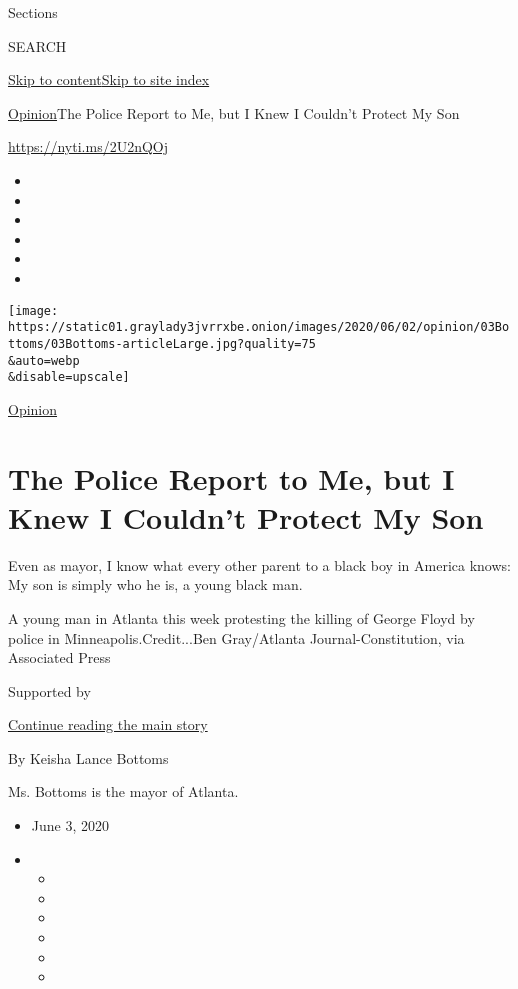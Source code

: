 Sections

SEARCH

\protect\hyperlink{site-content}{Skip to
content}\protect\hyperlink{site-index}{Skip to site index}

\href{/section/opinion}{Opinion}\textbar{}The Police Report to Me, but I
Knew I Couldn't Protect My Son

\href{https://nyti.ms/2U2nQOj}{https://nyti.ms/2U2nQOj}

\begin{itemize}
\item
\item
\item
\item
\item
\item
\end{itemize}

\texttt{[image: https://static01.graylady3jvrrxbe.onion/images/2020/06/02/opinion/03Bottoms/03Bottoms-articleLarge.jpg?quality=75\\\&auto=webp\\\&disable=upscale]}

\href{/section/opinion}{Opinion}

\hypertarget{the-police-report-to-me-but-i-knew-i-couldnt-protect-my-son}{%
\section{The Police Report to Me, but I Knew I Couldn't Protect My
Son}\label{the-police-report-to-me-but-i-knew-i-couldnt-protect-my-son}}

Even as mayor, I know what every other parent to a black boy in America
knows: My son is simply who he is, a young black man.

A young man in Atlanta this week protesting the killing of George Floyd
by police in Minneapolis.Credit...Ben Gray/Atlanta Journal-Constitution,
via Associated Press

Supported by

\protect\hyperlink{after-sponsor}{Continue reading the main story}

By Keisha Lance Bottoms

Ms. Bottoms is the mayor of Atlanta.

\begin{itemize}
\item
  June 3, 2020
\item
  \begin{itemize}
  \item
  \item
  \item
  \item
  \item
  \item
  \end{itemize}
\end{itemize}

